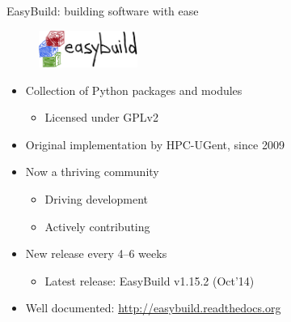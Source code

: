 \documentclass[10pt,xcolor={usenames,dvipsnames}]{beamer}
\begin{document}

\begin{frame}{EasyBuild: building software with ease}
\begin{figure}[centering]
    \includegraphics[height=1.2cm]{easybuild_logo.jpg}
\end{figure}
\begin{itemize}
    \item
        Collection of Python packages and modules
        \begin{itemize}
            \item
                Licensed under GPLv2
        \end{itemize}
    \item
        Original implementation by HPC-UGent, since 2009
    \item
        Now a thriving community
        \begin{itemize}
            \item Driving development
            \item Actively contributing
        \end{itemize}
    \item
        New release every 4--6 weeks
        \begin{itemize}
            \item Latest release: EasyBuild v1.15.2 (Oct'14)
        \end{itemize}
    \item
        Well documented: \url{http://easybuild.readthedocs.org}
\end{itemize}
\end{frame}

\end{document}
